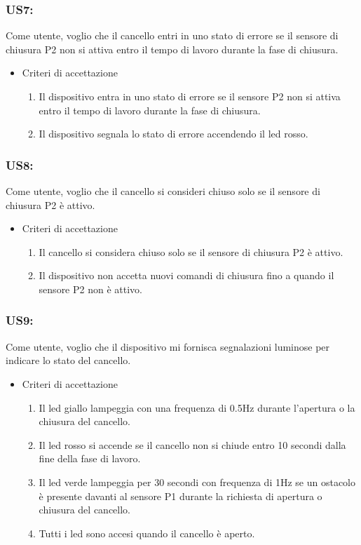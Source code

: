 \documentclass[12pt]{article}
\begin{document}
\subsubsection{US7:}
Come utente, voglio che il cancello entri in uno stato di errore se il sensore di chiusura P2 non si attiva entro il tempo di lavoro durante la fase di chiusura.
\begin{itemize}
    \item Criteri di accettazione
    \begin{enumerate}
        \item Il dispositivo entra in uno stato di errore se il sensore P2 non si attiva entro il tempo di lavoro durante la fase di chiusura.
        \item Il dispositivo segnala lo stato di errore accendendo il led rosso.
    \end{enumerate}
\end{itemize}
\subsubsection{US8:}
Come utente, voglio che il cancello si consideri chiuso solo se il sensore di chiusura P2 è attivo.
\begin{itemize}
    \item Criteri di accettazione
    \begin{enumerate}
        \item Il cancello si considera chiuso solo se il sensore di chiusura P2 è attivo.
        \item Il dispositivo non accetta nuovi comandi di chiusura fino a quando il sensore P2 non è attivo.
    \end{enumerate}
\end{itemize}
\subsubsection{US9:}
Come utente, voglio che il dispositivo mi fornisca segnalazioni luminose per indicare lo stato del cancello.
\begin{itemize}
    \item Criteri di accettazione
    \begin{enumerate}
        \item Il led giallo lampeggia con una frequenza di 0.5Hz durante l'apertura o la chiusura del cancello.
        \item Il led rosso si accende se il cancello non si chiude entro 10 secondi dalla fine della fase di lavoro.
        \item Il led verde lampeggia per 30 secondi con frequenza di 1Hz se un ostacolo è presente davanti al sensore P1 durante la richiesta di apertura o chiusura del cancello.
        \item Tutti i led sono accesi quando il cancello è aperto.
    \end{enumerate}
\end{itemize}
\newpage
\end{document}
